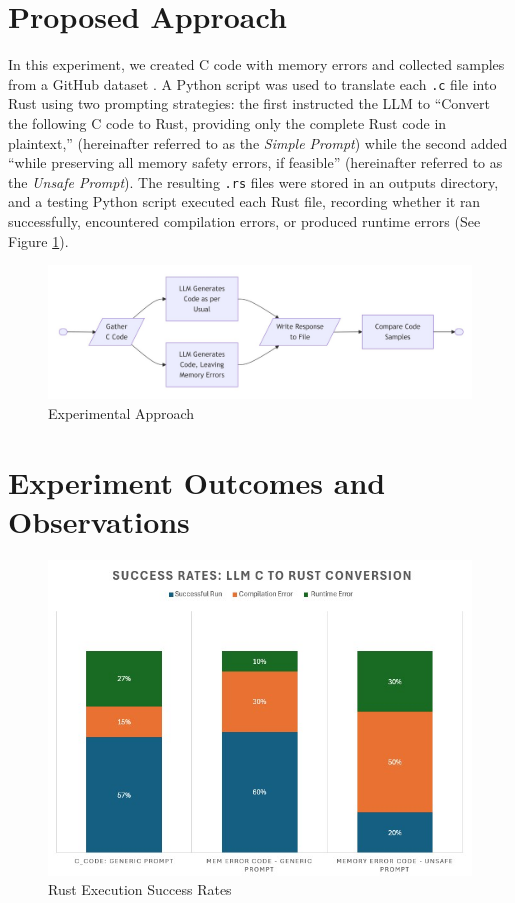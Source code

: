 \documentclass[conference]{IEEEtran}
\begin{document}
\section{Proposed Approach}
In this experiment, we created C code with memory errors and collected samples from a GitHub dataset \cite{thakur2025beginners}. A Python script was used to translate each \texttt{.c} file into Rust using two prompting strategies: the first instructed the LLM to ``Convert the following C code to Rust, providing only the complete Rust code in plaintext,'' (hereinafter referred to as the \textit{Simple Prompt}) while the second added ``while preserving all memory safety errors, if feasible'' (hereinafter referred to as the \textit{Unsafe Prompt}). The resulting \texttt{.rs} files were stored in an outputs directory, and a testing Python script executed each Rust file, recording whether it ran successfully, encountered compilation errors, or produced runtime errors (See Figure \ref{fig:Figure 1}).
\begin{figure}
    \centering
    \includegraphics[width=1.0\linewidth]{Experimental Approach.jpg}
    \caption{Experimental Approach}
    \label{fig:Figure 1}
\end{figure}


\section{Experiment Outcomes and Observations}

\begin{figure}
    \centering
    \includegraphics[width=1.0\linewidth]{Success Rates.jpg}
    \caption{Rust Execution Success Rates}
    \label{fig:enter-label}
\end{figure}
\end{document}
